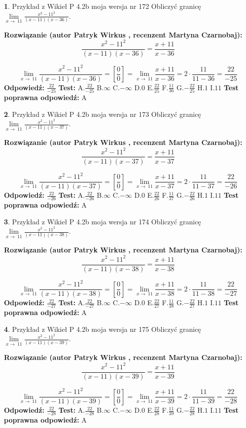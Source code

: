 \documentclass[12pt, a4paper]{article}
\theoremstyle{definition} %
\newtheorem{zad}{}
\newcommand{\zadStart}[1]{\begin{zad}#1\newline}
\newcommand{\zadStop}{\end{zad}}
\newcommand{\rozwStart}[2]{\noindent \textbf{Rozwiązanie (autor #1 , recenzent #2): }\newline}
\newcommand{\rozwStop}{\newline}
\newcommand{\odpStart}{\noindent \textbf{Odpowiedź:}\newline}
\newcommand{\odpStop}{\newline}
\newcommand{\testStart}{\noindent \textbf{Test:}\newline}
\newcommand{\testStop}{\newline}
\newcommand{\kluczStart}{\noindent \textbf{Test poprawna odpowiedź:}\newline}
\newcommand{\kluczStop}{\newline}
\begin{document}
\zadStart{Przykład z Wikieł P 4.2b moja wersja nr 172}
Obliczyć granicę $\lim\limits_{x\to\ 11}\frac{x^{2}-11^{2}}{(x-11)(x-36)}$.
\zadStop
\rozwStart{Patryk Wirkus}{Martyna Czarnobaj}
$$\frac{x^{2}-11^{2}}{(x-11)(x-36)}=\frac{x+11}{x-36}$$

$$\lim\limits_{x\to\ 11}\frac{x^{2}-11^{2}}{(x-11)(x-36)}=[\frac{0}{0}]=\lim\limits_{x\to\ 11}\frac{x+11}{x-36}=2 \cdot \frac{11}{11-36} = \frac{22}{-25}$$
\rozwStop
\odpStart
$\frac{22}{-25}$
\odpStop
\testStart
A.$\frac{22}{-25}$
B.$\infty$
C.$-\infty$
D.$0$
E.$\frac{22}{25}$
F.$\frac{11}{36}$
G.$-\frac{22}{25}$
H.$1$
I.$11$
\testStop
\kluczStart
A
\kluczStop



\zadStart{Przykład z Wikieł P 4.2b moja wersja nr 173}
Obliczyć granicę $\lim\limits_{x\to\ 11}\frac{x^{2}-11^{2}}{(x-11)(x-37)}$.
\zadStop
\rozwStart{Patryk Wirkus}{Martyna Czarnobaj}
$$\frac{x^{2}-11^{2}}{(x-11)(x-37)}=\frac{x+11}{x-37}$$

$$\lim\limits_{x\to\ 11}\frac{x^{2}-11^{2}}{(x-11)(x-37)}=[\frac{0}{0}]=\lim\limits_{x\to\ 11}\frac{x+11}{x-37}=2 \cdot \frac{11}{11-37} = \frac{22}{-26}$$
\rozwStop
\odpStart
$\frac{22}{-26}$
\odpStop
\testStart
A.$\frac{22}{-26}$
B.$\infty$
C.$-\infty$
D.$0$
E.$\frac{22}{26}$
F.$\frac{11}{37}$
G.$-\frac{22}{26}$
H.$1$
I.$11$
\testStop
\kluczStart
A
\kluczStop



\zadStart{Przykład z Wikieł P 4.2b moja wersja nr 174}
Obliczyć granicę $\lim\limits_{x\to\ 11}\frac{x^{2}-11^{2}}{(x-11)(x-38)}$.
\zadStop
\rozwStart{Patryk Wirkus}{Martyna Czarnobaj}
$$\frac{x^{2}-11^{2}}{(x-11)(x-38)}=\frac{x+11}{x-38}$$

$$\lim\limits_{x\to\ 11}\frac{x^{2}-11^{2}}{(x-11)(x-38)}=[\frac{0}{0}]=\lim\limits_{x\to\ 11}\frac{x+11}{x-38}=2 \cdot \frac{11}{11-38} = \frac{22}{-27}$$
\rozwStop
\odpStart
$\frac{22}{-27}$
\odpStop
\testStart
A.$\frac{22}{-27}$
B.$\infty$
C.$-\infty$
D.$0$
E.$\frac{22}{27}$
F.$\frac{11}{38}$
G.$-\frac{22}{27}$
H.$1$
I.$11$
\testStop
\kluczStart
A
\kluczStop



\zadStart{Przykład z Wikieł P 4.2b moja wersja nr 175}
Obliczyć granicę $\lim\limits_{x\to\ 11}\frac{x^{2}-11^{2}}{(x-11)(x-39)}$.
\zadStop
\rozwStart{Patryk Wirkus}{Martyna Czarnobaj}
$$\frac{x^{2}-11^{2}}{(x-11)(x-39)}=\frac{x+11}{x-39}$$

$$\lim\limits_{x\to\ 11}\frac{x^{2}-11^{2}}{(x-11)(x-39)}=[\frac{0}{0}]=\lim\limits_{x\to\ 11}\frac{x+11}{x-39}=2 \cdot \frac{11}{11-39} = \frac{22}{-28}$$
\rozwStop
\odpStart
$\frac{22}{-28}$
\odpStop
\testStart
A.$\frac{22}{-28}$
B.$\infty$
C.$-\infty$
D.$0$
E.$\frac{22}{28}$
F.$\frac{11}{39}$
G.$-\frac{22}{28}$
H.$1$
I.$11$
\testStop
\kluczStart
A
\kluczStop
\end{document}
